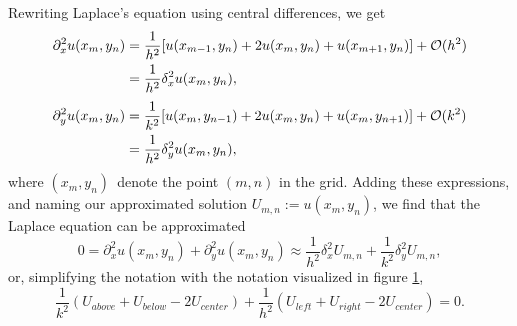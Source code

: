 Rewriting Laplace's equation using central differences, we get
\begin{equation*}
    \begin{split}
    \partial^2_x u(x_m, y_n) 
        &= \frac{1}{h^2}[u(x_{m-1},y_n) + 2u(x_m,y_n) + u(x_{m+1},y_n)] + \mathcal{O}(h^2)\\
        &= \frac{1}{h^2}\delta^2_x u(x_m,y_n),\\
    \end{split}
\end{equation*}
\begin{equation*}
    \begin{split}
    \partial^2_y u(x_m, y_n) 
        &= \frac{1}{k^2}[u(x_{m},y_{n-1}) + 2u(x_m,y_n) + u(x_{m},y_{n+1})] + \mathcal{O}(k^2)\\
        &= \frac{1}{h^2}\delta^2_y u(x_m,y_n),\\
    \end{split}
\end{equation*}
where $(x_m, y_n)$ denote the point $(m,n)$ in the grid. 
Adding these expressions, and naming our approximated solution $U_{m,n} := u(x_m,y_n)$, we find that the Laplace equation can be approximated 
\begin{equation*}
    0 = \partial^2_x u(x_m,y_n) + \partial^2_y u(x_m,y_n)
    \approx \frac{1}{h^2}\delta^2_x U_{m,n} + \frac{1}{k^2}\delta^2_y U_{m,n},
\end{equation*}
or, simplifying the notation with the notation visualized in figure \ref{ex3:fig:stencil},
\begin{equation*}
    \frac{1}{k^2}(U_{above} + U_{below} - 2U_{center}) + \frac{1}{h^2}(U_{left} + U_{right} - 2U_{center}) = 0.
\end{equation*}

\begin{figure}[hb]
    \centering
    
    \label{ex3:fig:stencil}
\end{figure}

